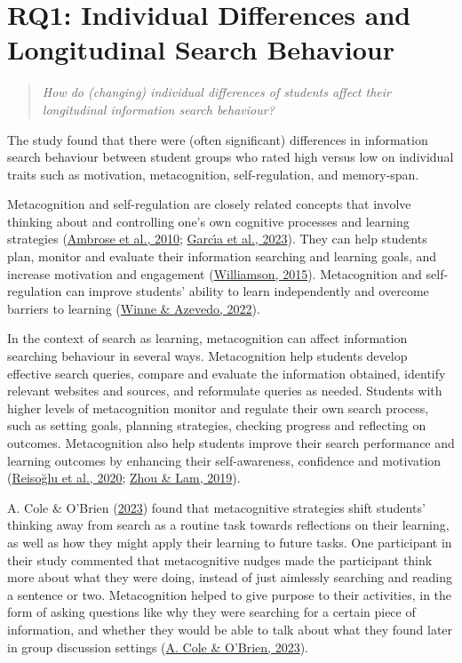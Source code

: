 \documentclass[letterpaper, nobind]{templates/ociamthesis}
\begin{document}
\hypertarget{rq1-individual-differences-and-longitudinal-search-behaviour}{%
\section{RQ1: Individual Differences and Longitudinal Search Behaviour}\label{rq1-individual-differences-and-longitudinal-search-behaviour}}

\begin{quote}
\emph{How do (changing) individual differences of students affect their longitudinal information search behaviour?}
\end{quote}

The study found that there were (often significant) differences in information search behaviour between student groups who rated high versus low on individual traits such as motivation, metacognition, self-regulation, and memory-span.

Metacognition and self-regulation are closely related concepts that involve thinking about and controlling one's own cognitive processes and learning strategies (\protect\hyperlink{ref-ambrose2010howa}{Ambrose et al., 2010}; \protect\hyperlink{ref-garcia2023motivational}{Garcı́a et al., 2023}).
They can help students plan, monitor and evaluate their information searching and learning goals, and increase motivation and engagement (\protect\hyperlink{ref-williamson2015selfregulated}{Williamson, 2015}).
Metacognition and self-regulation can improve students' ability to learn independently and overcome barriers to learning (\protect\hyperlink{ref-winne2022metacognition}{Winne \& Azevedo, 2022}).

In the context of search as learning, metacognition can affect information searching behaviour in several ways.
Metacognition help students develop effective search queries, compare and evaluate the information obtained, identify relevant websites and sources, and reformulate queries as needed.
Students with higher levels of metacognition monitor and regulate their own search process, such as setting goals, planning strategies, checking progress and reflecting on outcomes.
Metacognition also help students improve their search performance and learning outcomes by enhancing their self-awareness, confidence and motivation (\protect\hyperlink{ref-reisouglu2020analysis}{Reisoğlu et al., 2020}; \protect\hyperlink{ref-zhou2019metacognitive}{Zhou \& Lam, 2019}).

A. Cole \& O'Brien (\protect\hyperlink{ref-cole2023using}{2023}) found that metacognitive strategies shift students' thinking away from search as a routine task towards reflections on their learning, as well as how they might apply their learning to future tasks.
One participant in their study commented that metacognitive nudges made the participant think more about what they were doing, instead of just aimlessly searching and reading a sentence or two.
Metacognition helped to give purpose to their activities, in the form of asking questions like why they were searching for a certain piece of information, and whether they would be able to talk about what they found later in group discussion settings (\protect\hyperlink{ref-cole2023using}{A. Cole \& O'Brien, 2023}).
\end{document}
